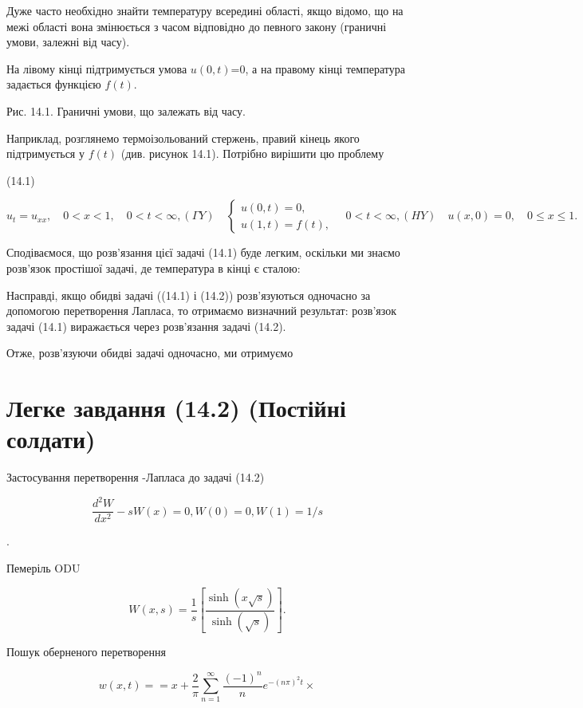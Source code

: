 \documentclass[
  ukrainian,
]{article}
\begin{document}
Дуже часто необхідно знайти температуру всередині області, якщо відомо,
що на межі області вона змінюється з часом відповідно до певного закону
(граничні умови, залежні від часу).

На лівому кінці підтримується умова \(u(0,t)\)=0, а на правому кінці
температура задається функцією \(f(t)\).

Рис. 14.1. Граничні умови, що залежать від часу.

Наприклад, розглянемо термоізольований стержень, правий кінець якого
підтримується у \(f(t)\) (див. рисунок 14.1). Потрібно вирішити цю
проблему

(14.1)

\[
u_{t} = u_{xx}, \quad 0 < x < 1, \quad 0 < t < \infty,
(\Gamma Y) \quad \begin{cases} u(0, t) = 0, \\ u(1, t) = f(t), \end{cases} \quad 0 < t < \infty,
(HY) \quad u(x, 0) = 0, \quad 0 \le x \le 1.
\]

Сподіваємося, що розв'язання цієї задачі (14.1) буде легким, оскільки ми
знаємо розв'язок простішої задачі, де температура в кінці є сталою:

Насправді, якщо обидві задачі ((14.1) і (14.2)) розв'язуються одночасно
за допомогою перетворення Лапласа, то отримаємо визначний результат:
розв'язок задачі (14.1) виражається через розв'язання задачі (14.2).

Отже, розв'язуючи обидві задачі одночасно, ми отримуємо

\section{Легке завдання (14.2) (Постійні
солдати)}\label{ux43bux435ux433ux43aux435-ux437ux430ux432ux434ux430ux43dux43dux44f-14.2-ux43fux43eux441ux442ux456ux439ux43dux456-ux441ux43eux43bux434ux430ux442ux438}

Застосування перетворення -Лапласа до задачі (14.2)

\[
\frac{d^2W}{dx^2} - sW(x) = 0,
W(0) = 0,
W(1) = 1/s
\]

.

Пемеріль ODU

\[
W(x, s) = \frac{1}{s} \left[ \frac{\sinh(x \sqrt{s})}{\sinh(\sqrt{s})} \right].
\]

Пошук оберненого перетворення

\[
w(x, t) =
= x + \frac{2}{\pi} \sum_{n=1}^{\infty} \frac{(-1)^n}{n} e^{-(n\pi)^2 t} \times
\]
\end{document}
